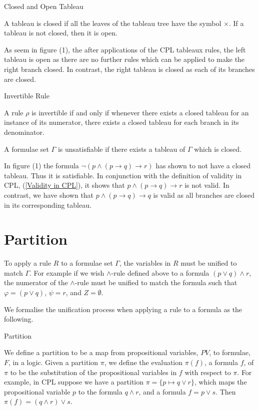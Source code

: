 \documentclass{llncs}
\newcommand*\lif{\mathbin{\to}}
\begin{document}
\begin{definition}{Closed and Open Tableau}

A tableau is closed if all the leaves of the tableau tree have the symbol
$\times$. If a tableau is not closed, then it is open.
\end{definition}

As seem in figure (1), the after applications of the CPL
tableaux rules, the left tableau is open as there are no further rules which
can be applied to make the right branch closed. In contrast, the right tableau
is closed as each of its branches are closed.

\begin{definition}{Invertible Rule}\label{Invertible Rule}

A rule $\rho$ is invertible if and only if whenever there exists a closed
tableau for an instance of its numerator, there exists a closed tableau for
each branch in its denominator.
\end{definition}
\begin{definition}

A formulae set $\Gamma$ is unsatisfiable if there exists a tableau of $\Gamma$
which is closed.
\end{definition}

In figure (1) the formula $\neg (p \land (p \lif q) \lif
r)$ has shown to not have a closed tableau. Thus it is satisfiable. In
conjunction with the definition of validity in CPL, (\ref{Validity in CPL}), it
shows that $p \land (p \lif q) \lif r$ is not valid. In contrast, we
have shown that $p \land (p \lif q) \lif q$ is valid as all branches are closed
in its corresponding tableau.

\section{Partition}

To apply a rule $R$ to a formulae set $\Gamma$, the variables in $R$ must be
unified to match $\Gamma$. For example if we wish $\land$-rule defined above
to a formula $(p \lor q) \land r$, the numerator of the $\land$-rule must be
unified to match the formula such that $\varphi = (p \lor q)$, $\psi = r$, and
$Z = \emptyset$.

We formalise the unification process when applying a rule to a formula as the
following.
\begin{definition}{Partition}\label{Partition}

We define a partition to be a map from propositional variables, $PV$, to
formulae, $F$, in a logic. Given a partition $\pi$, we define the evaluation
$\pi(f)$, a formula $f$, of $\pi$ to be the substitution of the propositional
variables in $f$ with respect to $\pi$. For example, in CPL suppose we have a
partition $\pi = \{p \mapsto q \lor r\}$, which maps the propositional variable
$p$ to the formula $q \wedge r$, and a formula $f = p \vee s$. Then $\pi(f) =
(q \wedge r) \vee s$.
\end{definition}
\end{document}
